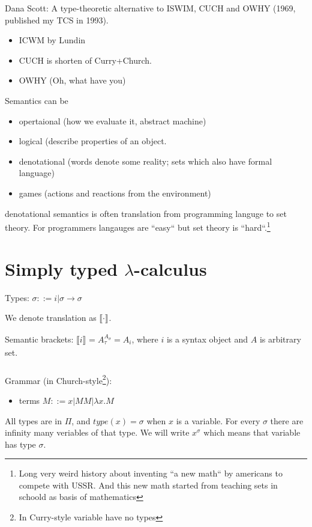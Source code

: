 \documentclass[a4paper,10pt]{book}
\newcommand{\sem}[2]{ \llbracket#1\rrbracket_{#2} }
\newcommand{\rarr}{ \rightarrow }
\begin{document}
Dana Scott:  A type-theoretic alternative to ISWIM, CUCH and OWHY (1969, published my TCS in 1993).

\begin{itemize}
\item ICWM by Lundin
\item CUCH is shorten of Curry+Church.
\item OWHY (Oh, what have you)
\end{itemize}

Semantics can be 
\begin{itemize}
\item opertaional (how we evaluate it, abstract machine)
\item logical (describe properties of an object.
\item denotational (words denote some reality; sets which also have formal language)
\item games (actions and reactions from the environment)
\end{itemize}

denotational semantics is often translation from programming languge to set theory. For programmers 
langauges are ``easy`` but set theory is ``hard``.\footnote{
Long very weird history about inventing ``a new math`` by americans to compete with USSR.
And this new math started from teaching sets in schoold as basis of mathematics}

\chapter{Simply typed $\lambda$-calculus}

Types: $\sigma ::= i | \sigma \rarr \sigma$

We denote translation as $\sem{\cdot}{}$.

Semantic brackets: $\sem{i}{} = A_{\tau}^{A_\sigma} = A_i $, 
where $i$ is a syntax object and $A$ is arbitrary set.

\paragraph{}
Grammar (in Church-style\footnote{In Curry-style variable have no types}): 
\begin{itemize}
 \item terms $M ::= x | MM | \lambda x . M$
\end{itemize}
All types are in $\Pi$, and $type(x) = \sigma$ when $x$ is a variable. For every $\sigma$ there 
are infinity many veriables of that type. We will write $x^\sigma$ which means that variable has 
type $\sigma$.
\end{document}
